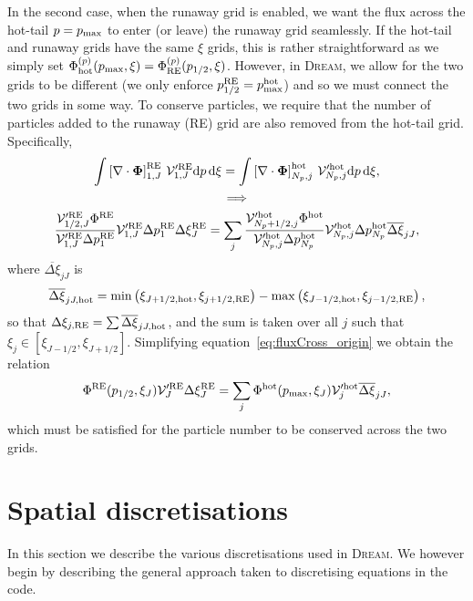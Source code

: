 \documentclass{notes}
\newcommand{\DREAM}{\textsc{Dream}}
\newcommand{\Vp}{\mathcal{V}'}
\begin{document}
    In the second case, when the runaway grid is enabled, we want the flux
    across the hot-tail $p=p_{\rm max}$ to enter (or leave) the runaway grid
    seamlessly. If the hot-tail and runaway grids have the same $\xi$ grids,
    this is rather straightforward as we simply set 
    $\Phi^{(p)}_{\rm hot}(p_{\rm max},\xi) = \Phi^{(p)}_{\rm RE}(p_{1/2},\xi)$.
    However, in \DREAM, we allow for the two grids to be different (we only
    enforce $p^{\rm RE}_{1/2} = p^{\rm hot}_{\rm max}$) and so we must connect
    the two grids in some way. To conserve particles, we require that the
	number of particles added to the runaway (RE) grid are also removed from
	the hot-tail grid. Specifically,
	\begin{equation}\label{eq:fluxCross_origin}
		\begin{gathered}
			\int \left[\nabla\cdot\bb{\Phi}\right]^{\rm RE}_{1,J}\,\Vp^{\rm RE}_{1,J}\dd p\,\dd\xi =
			\int \left[\nabla\cdot\bb{\Phi}\right]^{\rm hot}_{N_p,j}\,\Vp^{\rm hot}_{N_p,j}\dd p\,\dd\xi,\\
			\implies\\
			\frac{\Vp^{\rm RE}_{1/2,J}\Phi^{\rm RE}}{\Vp^{\rm RE}_{1,J}\Delta p^{\rm RE}_1}\Vp^{\rm RE}_{1,J}\Delta p^{\rm RE}_1 \Delta\xi^{\rm RE}_J =
			\sum_j\frac{\Vp^{\rm hot}_{N_p+1/2,j}\Phi^{\rm hot}}{\Vp^{\rm hot}_{N_p,j}\Delta p^{\rm hot}_{N_p}}\Vp^{\rm hot}_{N_p,j}\Delta p^{\rm hot}_{N_p} \overline{\Delta\xi}_{jJ},
		\end{gathered}
	\end{equation}
	where $\overline{\Delta\xi}_{jJ}$ is
    \begin{equation}\label{eq:PhiPinterp}
        \overline{\Delta\xi}_{jJ,\rm hot} = \min\left(\xi_{J+1/2,{\rm hot}},\xi_{j+1/2,{\rm RE}}\right) -
        \max\left( \xi_{J-1/2,{\rm hot}}, \xi_{j-1/2,{\rm RE}} \right),
    \end{equation}
    so that $\Delta\xi_{j,\rm RE} = \sum\overline{\Delta\xi}_{jJ,\rm hot}$, and
	the sum is taken over all $j$ such that $\xi_j\in[\xi_{J-1/2}, \xi_{J+1/2}]$.
	Simplifying equation~\eqref{eq:fluxCross_origin} we obtain the relation
    \begin{equation}\label{eq:fluxCross}
        \Phi^{\rm RE}(p_{1/2},\xi_J)\Vp^{\rm RE}_{J}\Delta\xi^{\rm RE}_{J} =
        \sum_{j} \Phi^{\rm hot}(p_{\rm max},\xi_J) \Vp^{\rm hot}_{j} \overline{\Delta\xi}_{jJ},
    \end{equation}
	which must be satisfied for the particle number to be conserved across the
	two grids.

    \section{Spatial discretisations}
    In this section we describe the various discretisations used in \DREAM. We
    however begin by describing the general approach taken to discretising
    equations in the code.
\end{document}
